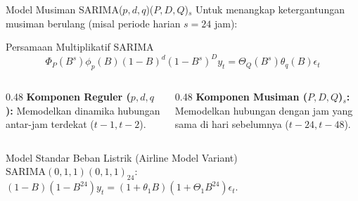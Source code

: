 \documentclass[aspectratio=169, 10pt]{beamer}
\begin{document}
\begin{frame}{Model Musiman SARIMA($p,d,q$)($P,D,Q$)$_s$}
    Untuk menangkap ketergantungan musiman berulang (misal periode harian $s=24$ jam):
    \begin{block}{Persamaan Multiplikatif SARIMA}
        \begin{equation}
            \Phi_P(B^s)\phi_p(B)(1 - B)^d(1 - B^s)^D y_t = \Theta_Q(B^s)\theta_q(B)\epsilon_t
        \end{equation}
    \end{block}
    \begin{columns}[T]
        \begin{column}{0.48\textwidth}
            \textbf{Komponen Reguler ($p, d, q$):}
            Memodelkan dinamika hubungan antar-jam terdekat ($t-1, t-2$).
        \end{column}
        \begin{column}{0.48\textwidth}
            \textbf{Komponen Musiman ($P, D, Q$)$_s$:}
            Memodelkan hubungan dengan jam yang sama di hari sebelumnya ($t-24, t-48$).
        \end{column}
    \end{columns}
    \vspace{0.2cm}
    \begin{alertblock}{Model Standar Beban Listrik (Airline Model Variant)}
        $\text{SARIMA}(0,1,1)(0,1,1)_{24}$: $(1-B)(1-B^{24})y_t = (1+\theta_1 B)(1+\Theta_1 B^{24})\epsilon_t$.
    \end{alertblock}
\end{frame}
\end{document}
